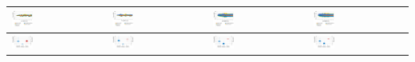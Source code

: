 \begin{table}[b]
\begin{tabularx}{\textwidth}{|Y|Y|Y|Y|}
 		\includegraphics[width=0.23\textwidth]{../gfx/data/E1_001.png} &
		\includegraphics[width=0.23\textwidth]{../gfx/data/E2_001.png} &
		\includegraphics[width=0.23\textwidth]{../gfx/data/E3_001.png} &
		\includegraphics[width=0.23\textwidth]{../gfx/data/E4_001.png} \\
		
		\hline
		
		\includegraphics[width=0.23\textwidth]{../gfx/data/E1_002.png} &
		\includegraphics[width=0.23\textwidth]{../gfx/data/E2_002.png} &
		\includegraphics[width=0.23\textwidth]{../gfx/data/E3_002.png} &
		\includegraphics[width=0.23\textwidth]{../gfx/data/E4_002.png} \\
		

\end{tabularx}
\end{table}
